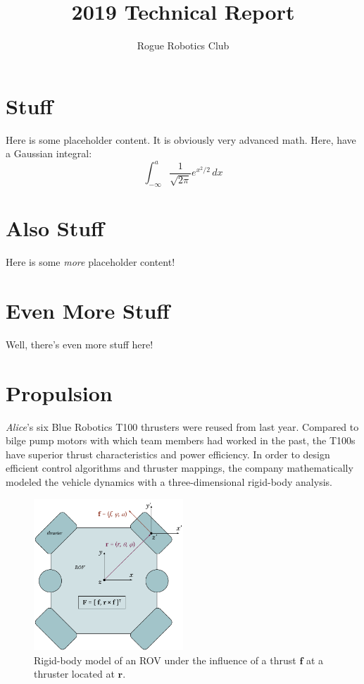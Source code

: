 \documentclass{roguedoc}
\title{2019 Technical Report}
\author{Rogue Robotics Club}
\renewcommand{\vec}[1]{\mathbf{#1}}
\begin{document}
\roguetoc{}

\section{Stuff}
Here is some placeholder content. It is obviously very advanced math. Here, have a Gaussian integral:
\begin{equation}
  \int _{-\infty} ^{a} \frac{1}{\sqrt{2\pi}} e^{x^2/2}\,dx
\end{equation}

\section{Also Stuff}
Here is some \emph{more} placeholder content!

\section{Even More Stuff}
Well, there's even more stuff here!

\section{Propulsion}
\emph{Alice}'s six Blue Robotics T100 thrusters were reused from last year. Compared to bilge pump motors with which team members had worked in the past, the T100s have superior thrust characteristics and power efficiency. In order to design efficient control algorithms and thruster mappings, the company mathematically modeled the vehicle dynamics with a three-dimensional rigid-body analysis.

\begin{figure}[H]
  \centering
  \includegraphics[width=0.5\textwidth]{img/thruster_mapping.pdf}
  \caption{Rigid-body model of an ROV under the influence of a thrust $\vec{f}$ at a thruster located at $\vec{r}$.}
\end{figure}
\end{document}
